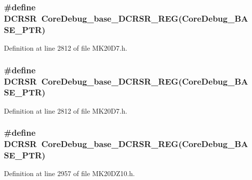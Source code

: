 \subsubsection[{\texorpdfstring{D\+C\+R\+SR}{DCRSR}}]{\setlength{\rightskip}{0pt plus 5cm}\#define D\+C\+R\+SR~{\bf Core\+Debug\+\_\+base\+\_\+\+D\+C\+R\+S\+R\+\_\+\+R\+EG}({\bf Core\+Debug\+\_\+\+B\+A\+S\+E\+\_\+\+P\+TR})}\hypertarget{group___core_debug___register___accessor___macros_gabd5ddab120c0e09c0198d49c25713be3}{}\label{group___core_debug___register___accessor___macros_gabd5ddab120c0e09c0198d49c25713be3}


Definition at line 2812 of file M\+K20\+D7.\+h.

\subsubsection[{\texorpdfstring{D\+C\+R\+SR}{DCRSR}}]{\setlength{\rightskip}{0pt plus 5cm}\#define D\+C\+R\+SR~{\bf Core\+Debug\+\_\+base\+\_\+\+D\+C\+R\+S\+R\+\_\+\+R\+EG}({\bf Core\+Debug\+\_\+\+B\+A\+S\+E\+\_\+\+P\+TR})}\hypertarget{group___core_debug___register___accessor___macros_gabd5ddab120c0e09c0198d49c25713be3}{}\label{group___core_debug___register___accessor___macros_gabd5ddab120c0e09c0198d49c25713be3}


Definition at line 2812 of file M\+K20\+D7.\+h.

\subsubsection[{\texorpdfstring{D\+C\+R\+SR}{DCRSR}}]{\setlength{\rightskip}{0pt plus 5cm}\#define D\+C\+R\+SR~{\bf Core\+Debug\+\_\+base\+\_\+\+D\+C\+R\+S\+R\+\_\+\+R\+EG}({\bf Core\+Debug\+\_\+\+B\+A\+S\+E\+\_\+\+P\+TR})}\hypertarget{group___core_debug___register___accessor___macros_gabd5ddab120c0e09c0198d49c25713be3}{}\label{group___core_debug___register___accessor___macros_gabd5ddab120c0e09c0198d49c25713be3}


Definition at line 2957 of file M\+K20\+D\+Z10.\+h.

